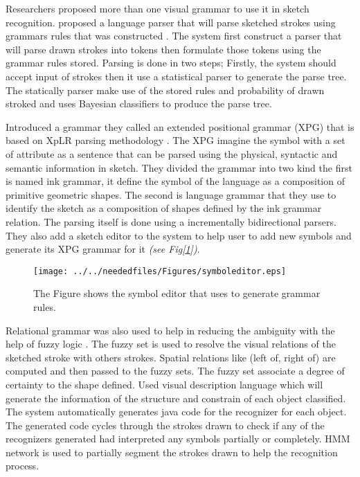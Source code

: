 Researchers proposed more than one visual grammar to use it in sketch recognition. \cite{statisticalparsing26} proposed a language parser that will parse sketched strokes using grammars rules that was constructed . The system first construct a parser that will parse drawn strokes into tokens then formulate those tokens using the grammar rules stored. Parsing is done in two steps; Firstly, the system should accept input of strokes then it use a statistical parser to generate the parse tree. The statically parser make use of the stored rules and probability of drawn stroked and uses Bayesian classifiers to produce the parse tree. 

Introduced a grammar they called an extended positional grammar (XPG) that is based on XpLR parsing methodology \cite{XPGParser59} . The XPG imagine the symbol with a set of attribute as a sentence that can be parsed using the physical, syntactic and semantic information in sketch. They divided the grammar into two kind the first is named ink grammar, it define the symbol of the language as a composition of primitive geometric shapes. The second is language grammar that they use to identify the sketch as a composition of shapes defined by the ink grammar relation. The parsing itself is done using a incrementally bidirectional parsers. They also add a sketch editor to the system to help user to add new symbols and generate its XPG grammar for it \textit{(see Fig[\ref{fig:symboleditor}])}.


\begin{figure}
	\centering
		\texttt{[image: ../../neededfiles/Figures/symboleditor.eps]}
	\caption[symbol editor]{The Figure shows the symbol editor that\cite{XPGParser59} uses to generate grammar rules.}
	\label{fig:symboleditor}
\end{figure}

Relational grammar was also used to help in reducing the ambiguity with the help of fuzzy logic\cite {visualpattern43} . The fuzzy set is used to resolve the visual relations of the sketched stroke with others strokes. Spatial relations like (left of, right of) are computed and then passed to the fuzzy sets. The fuzzy set associate a degree of certainty to the shape defined. 
\cite{Ladder30,GenericHMM28}  Used visual description language which will generate the information of the structure and constrain of each object classified. The system automatically generates java code for the recognizer for each object. The generated code cycles through the strokes drawn to check if any of the recognizers generated had interpreted any symbols partially or completely. HMM network is used to partially segment the strokes drawn to help the recognition process. 

